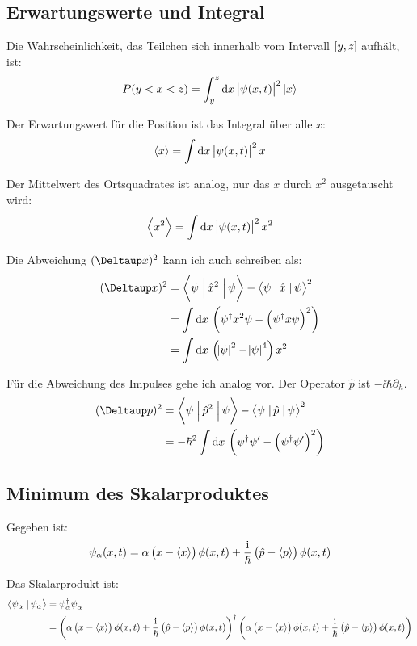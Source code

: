 \subsection{Erwartungswerte und Integral}

Die Wahrscheinlichkeit, das Teilchen sich innerhalb vom Intervall $\intcc{y,
z}$ aufhält, ist:
\[
	P(y < x < z) = \int_y^z \dif x \, \abs{\psi(x, t)}^2 \ket x
\]

Der Erwartungswert für die Position ist das Integral über alle $x$:
\[
	\bracket x = \int\dif x \, \abs{\psi(x, t)}^2 x
\]

Der Mittelwert des Ortsquadrates ist analog, nur das $x$ durch $x^2$
ausgetauscht wird:
\[
	\bracket{x^2} = \int\dif x \, \abs{\psi(x, t)}^2 x^2
\]

Die Abweichung $(\Deltaup x)^2$ kann ich auch schreiben als:
\cite{wikipedia-quantum_operators}
\begin{align*}
	(\Deltaup x)^2
	&= \braproket{\psi}{\hat x^2}{\psi} - \braproket{\psi}{\hat x}{\psi}^2 \\
	&= \int \dif x \, \del{\psi^\dagger x^2 \psi - \del{\psi^\dagger x \psi}^2} \\
	&= \int \dif x \, \del{\abs{\psi}^2 - \abs\psi^4} x^2
\end{align*}

Für die Abweichung des Impulses gehe ich analog vor. Der Operator $\hat p$ ist
$- \ii \hbar \partial_h$.
\begin{align*}
	(\Deltaup p)^2
	&= \braproket{\psi}{\hat p^2}{\psi} - \braproket{\psi}{\hat p}{\psi}^2 \\
	&= - \hbar^2 \int \dif x \, \del{\psi^\dagger \psi' - \del{\psi^\dagger \psi'}^2}
\end{align*}

\fehlt

\subsection{Minimum des Skalarproduktes}

Gegeben ist:
\[
	\psi_\alpha(x, t) = \alpha \del{x - \bracket x} \phi(x, t) + \frac\ii\hbar \del{\hat p - \bracket p} \phi(x, t)
\]

Das Skalarprodukt ist:
\begin{align*}
	\braket{\psi_\alpha}{\psi_\alpha}
	&= \psi_\alpha^\dagger \psi_\alpha^{} \\
	&= \del{\alpha \del{x - \bracket x} \phi(x, t) + \frac\ii\hbar \del{\hat p - \bracket p} \phi(x, t)}^\dagger \del{\alpha \del{x - \bracket x} \phi(x, t) + \frac\ii\hbar \del{\hat p - \bracket p} \phi(x, t)}
\end{align*}

